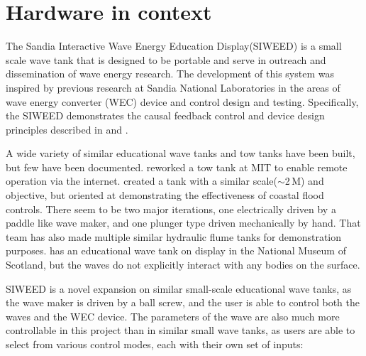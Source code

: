 \documentclass[11pt, letterpaper]{article}
\begin{document}
\section{Hardware in context} %
The Sandia Interactive Wave Energy Education Display(SIWEED) is a small scale wave tank that is designed to be portable and serve in outreach and dissemination of wave energy research.
The development of this system was inspired by previous research at Sandia National Laboratories in the areas of wave energy converter (WEC) device and control design and testing.
Specifically, the SIWEED demonstrates the causal feedback control and device design principles described in \citet{Bacelli2020} and \citet{Coe2020a}.


A wide variety of similar educational wave tanks and tow tanks have been built, but few have been documented.
\citet{unger2006creating} reworked a tow tank at MIT to enable remote operation via the internet.
\citet{Trust2015} created a tank with a similar scale($\sim$2\,M) and objective, but oriented at demonstrating the effectiveness of coastal flood controls.
There seem to be two major iterations, one electrically driven by a paddle like wave maker, and one plunger type driven mechanically by hand. 
That team has also made multiple similar hydraulic flume tanks for demonstration purposes.
\citet{Ivan2016} has an educational wave tank on display in the National Museum of Scotland, but the waves do not explicitly interact with any bodies on the surface. 

SIWEED is a novel expansion on similar small-scale educational wave tanks, as the wave maker is driven by a ball screw, and the user is able to control both the waves and the WEC device.
The parameters of the wave are also much more controllable in this project than in similar small wave tanks, as users are able to select from various control modes, each with their own set of inputs:
\end{document}
